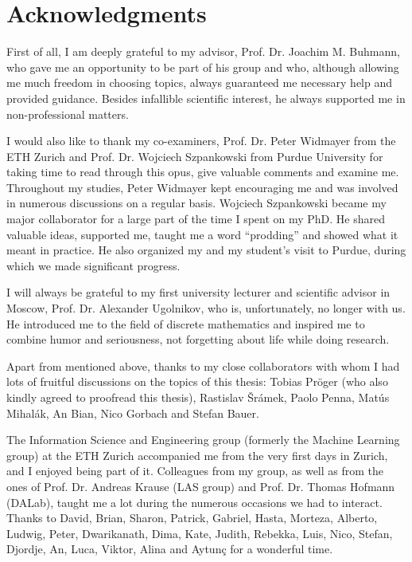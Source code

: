 \chapter*{Acknowledgments}

First of all, I am deeply grateful to my advisor, Prof. Dr. Joachim M. Buhmann,
who gave me an opportunity to be part of his group and who, although allowing me
much freedom in choosing topics, always guaranteed me necessary help and
provided guidance. Besides infallible scientific interest, he always supported
me in non-professional matters.

I would also like to thank my co-examiners, Prof. Dr. Peter Widmayer from the
ETH Zurich and Prof. Dr. Wojciech Szpankowski from Purdue University for taking
time to read through this opus, give valuable comments and examine me.
Throughout my studies, Peter Widmayer kept encouraging me and was involved in
numerous discussions on a regular basis. Wojciech Szpankowski became my major
collaborator for a large part of the time I spent on my PhD. He shared valuable
ideas, supported me, taught me a word ``prodding'' and showed what it meant in
practice. He also organized my and my student's visit to Purdue, during which we
made significant progress.

I will always be grateful to my first university lecturer and scientific advisor
in Moscow, Prof. Dr. Alexander Ugolnikov, who is, unfortunately, no longer with
us. He introduced me to the field of discrete mathematics and inspired me to
combine humor and seriousness, not forgetting about life while doing research.

Apart from mentioned above, thanks to my close collaborators with whom I had
lots of fruitful discussions on the topics of this thesis: Tobias Pr\"oger (who
also kindly agreed to proofread this thesis), Rastislav \v{S}r\'amek, Paolo
Penna, Mat{\'{u}}s Mihal{\'{a}}k, An Bian, Nico Gorbach and Stefan Bauer.

The Information Science and Engineering group (formerly the Machine Learning
group) at the ETH Zurich accompanied me from the very first days in Zurich, and I
enjoyed being part of it. Colleagues from my group, as well as from the ones of
Prof. Dr. Andreas Krause (LAS group) and Prof. Dr. Thomas Hofmann (DALab),
taught me a lot during the numerous occasions we had to interact. 
Thanks to David, Brian, Sharon, Patrick, Gabriel, Hasta, Morteza, Alberto,
Ludwig, Peter, Dwarikanath, Dima, Kate, Judith, Rebekka, Luis, Nico, Stefan,
Djordje, An, Luca, Viktor, Alina and Aytun\c{c} for a wonderful time.

